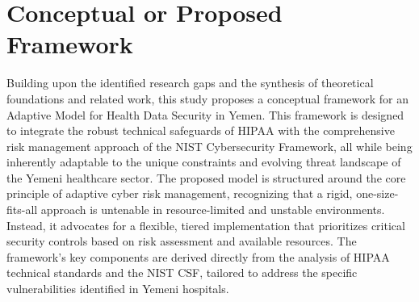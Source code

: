 \documentclass[12pt, a4paper, oneside]{report}
\begin{document}
	\section{Conceptual or Proposed Framework}
	Building upon the identified research gaps and the synthesis of theoretical foundations and related work, this study proposes a conceptual framework for an Adaptive Model for Health Data Security in Yemen. This framework is designed to integrate the robust technical safeguards of HIPAA with the comprehensive risk management approach of the NIST Cybersecurity Framework, all while being inherently adaptable to the unique constraints and evolving threat landscape of the Yemeni healthcare sector.
	The proposed model is structured around the core principle of adaptive cyber risk management, recognizing that a rigid, one-size-fits-all approach is untenable in resource-limited and unstable environments. Instead, it advocates for a flexible, tiered implementation that prioritizes critical security controls based on risk assessment and available resources. The framework’s key components are derived directly from the analysis of HIPAA technical standards and the NIST CSF, tailored to address the specific vulnerabilities identified in Yemeni hospitals.
	
\end{document}
